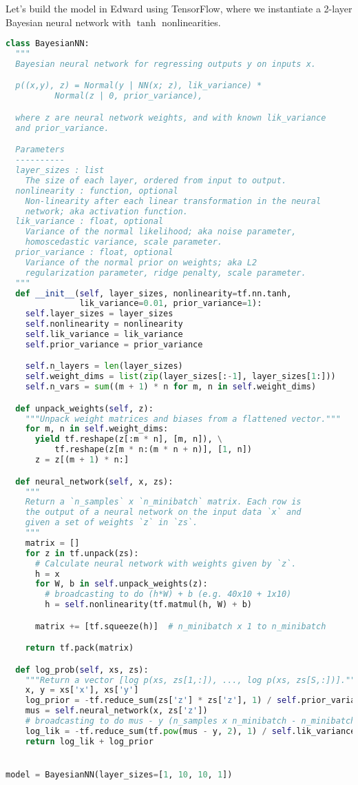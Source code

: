 Let's build the model in Edward using TensorFlow, where we
instantiate a 2-layer Bayesian neural network with $\tanh$
nonlinearities.
\begin{lstlisting}[language=Python]
class BayesianNN:
  """
  Bayesian neural network for regressing outputs y on inputs x.

  p((x,y), z) = Normal(y | NN(x; z), lik_variance) *
          Normal(z | 0, prior_variance),

  where z are neural network weights, and with known lik_variance
  and prior_variance.

  Parameters
  ----------
  layer_sizes : list
    The size of each layer, ordered from input to output.
  nonlinearity : function, optional
    Non-linearity after each linear transformation in the neural
    network; aka activation function.
  lik_variance : float, optional
    Variance of the normal likelihood; aka noise parameter,
    homoscedastic variance, scale parameter.
  prior_variance : float, optional
    Variance of the normal prior on weights; aka L2
    regularization parameter, ridge penalty, scale parameter.
  """
  def __init__(self, layer_sizes, nonlinearity=tf.nn.tanh,
               lik_variance=0.01, prior_variance=1):
    self.layer_sizes = layer_sizes
    self.nonlinearity = nonlinearity
    self.lik_variance = lik_variance
    self.prior_variance = prior_variance

    self.n_layers = len(layer_sizes)
    self.weight_dims = list(zip(layer_sizes[:-1], layer_sizes[1:]))
    self.n_vars = sum((m + 1) * n for m, n in self.weight_dims)

  def unpack_weights(self, z):
    """Unpack weight matrices and biases from a flattened vector."""
    for m, n in self.weight_dims:
      yield tf.reshape(z[:m * n], [m, n]), \
          tf.reshape(z[m * n:(m * n + n)], [1, n])
      z = z[(m + 1) * n:]

  def neural_network(self, x, zs):
    """
    Return a `n_samples` x `n_minibatch` matrix. Each row is
    the output of a neural network on the input data `x` and
    given a set of weights `z` in `zs`.
    """
    matrix = []
    for z in tf.unpack(zs):
      # Calculate neural network with weights given by `z`.
      h = x
      for W, b in self.unpack_weights(z):
        # broadcasting to do (h*W) + b (e.g. 40x10 + 1x10)
        h = self.nonlinearity(tf.matmul(h, W) + b)

      matrix += [tf.squeeze(h)]  # n_minibatch x 1 to n_minibatch

    return tf.pack(matrix)

  def log_prob(self, xs, zs):
    """Return a vector [log p(xs, zs[1,:]), ..., log p(xs, zs[S,:])]."""
    x, y = xs['x'], xs['y']
    log_prior = -tf.reduce_sum(zs['z'] * zs['z'], 1) / self.prior_variance
    mus = self.neural_network(x, zs['z'])
    # broadcasting to do mus - y (n_samples x n_minibatch - n_minibatch)
    log_lik = -tf.reduce_sum(tf.pow(mus - y, 2), 1) / self.lik_variance
    return log_lik + log_prior


model = BayesianNN(layer_sizes=[1, 10, 10, 1])
\end{lstlisting}


